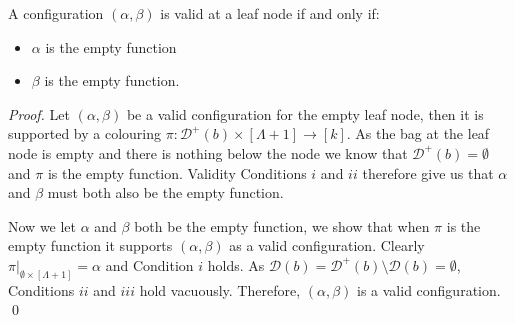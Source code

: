 \documentclass[runningheads]{llncs}
\begin{document}
\begin{lemmarep}\label{lem:leaf}
    A configuration $(\alpha,\beta)$ is valid at a leaf node if and only if:
    \begin{itemize}
        \item $\alpha$ is the empty function
        \item $\beta$ is the empty function.
    \end{itemize}
\end{lemmarep}
\begin{proof}
Let $(\alpha,\beta)$ be a valid configuration for the empty leaf node, then it is supported by a colouring $\pi:\mathcal{D}^+(b) \times [\Lambda+1] \rightarrow [k]$. As the bag at the leaf node is empty and there is nothing below the node we know that $\mathcal{D}^+(b)=\emptyset$ and $\pi$ is the empty function. Validity Conditions $i$ and $ii$ therefore give us that $\alpha$ and $\beta$ must both also be the empty function.

Now we let $\alpha$ and $\beta$ both be the empty function, we show that when $\pi$ is the empty function it supports $(\alpha,\beta)$ as a valid configuration. Clearly $\pi|_{\emptyset \times [\Lambda+1]}=\alpha$ and Condition $i$ holds. As $\mathcal{D}(b)=\mathcal{D}^+(b) \setminus \mathcal{D}(b)= \emptyset$, Conditions $ii$ and $iii$ hold vacuously. Therefore, $(\alpha,\beta)$ is a valid configuration. 
\qed \end{proof}
\end{document}
